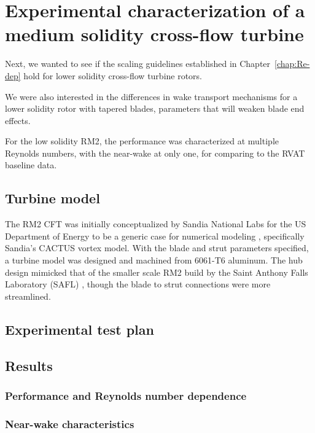 \chapter{Experimental characterization of a medium solidity cross-flow turbine}
\label{chap:RM2}

Next, we wanted to see if the scaling guidelines established in
Chapter~\ref{chap:Re-dep} hold for lower solidity cross-flow turbine rotors.

We were also interested in the differences in wake transport mechanisms for a
lower solidity rotor with tapered blades, parameters that will weaken blade end
effects.

For the low solidity RM2, the performance was characterized at multiple Reynolds
numbers, with the near-wake at only one, for comparing to the RVAT baseline
data.


\section{Turbine model}

The RM2 CFT was initially conceptualized by Sandia National Labs for the US
Department of Energy to be a generic case for numerical modeling
\cite{Barone2011}, specifically Sandia's CACTUS vortex model. With the blade and
strut parameters specified, a turbine model was designed and machined from
6061-T6 aluminum. The hub design mimicked that of the smaller scale RM2 build by
the Saint Anthony Falls Laboratory (SAFL) \cite{Hill2014}, though the blade to
strut connections were more streamlined.


\section{Experimental test plan}


\section{Results}


\subsection{Performance and Reynolds number dependence}


\subsection{Near-wake characteristics}


